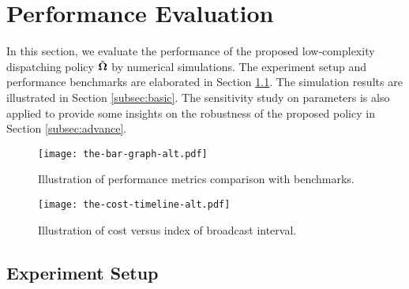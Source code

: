 \section{Performance Evaluation}
\label{sec:evaluation}
In this section, we evaluate the performance of the proposed low-complexity dispatching policy $\tilde{\boldsymbol{\Omega}}$ by numerical simulations.
The experiment setup and performance benchmarks are elaborated in Section \ref{subsec:setup}.
The simulation results are illustrated in Section \ref{subsec:basic}.
The sensitivity study on parameters is also applied to provide some insights on the robustness of the proposed policy in Section \ref{subsec:advance}.

\begin{figure}[t!]                                                      %
    \centering                                                          %
    \texttt{[image: the-bar-graph-alt.pdf]}               %
    \caption{Illustration of performance metrics comparison with benchmarks.}
    \label{fig:bar_plot}                                                %
\end{figure}                                                            %

\begin{figure}[t!]                                                                             %
    \centering                                                                                  %
    \texttt{[image: the-cost-timeline-alt.pdf]}                     %
    \caption{Illustration of cost versus index of broadcast interval.}
    \label{fig:general_timeline}                                                                %
\end{figure}                                                                                    %

\subsection{Experiment Setup}
\label{subsec:setup}

